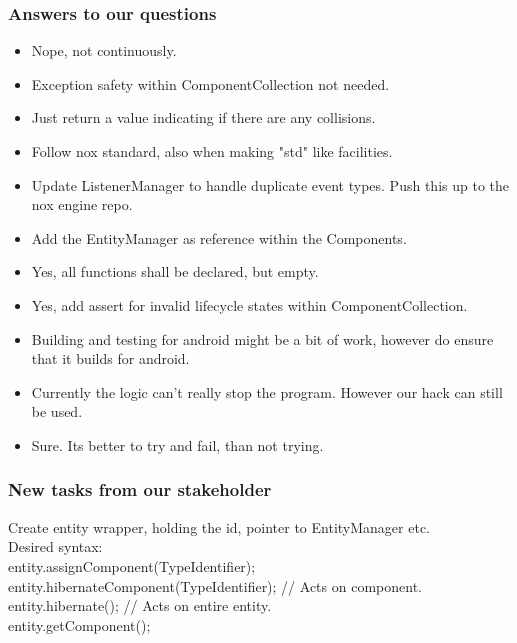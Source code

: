 \documentclass{article}
\begin{document}
\subsubsection*{Answers to our questions}
\begin{itemize}
    \item
    Nope, not continuously.

    \item
    Exception safety within ComponentCollection not needed.

    \item
    Just return a value indicating if there are any collisions.

    \item
    Follow nox standard, also when making "std" like facilities.

    \item
    Update ListenerManager to handle duplicate event types.
    Push this up to the nox engine repo.

    \item 
    Add the EntityManager as reference within the Components.

    \item
    Yes, all functions shall be declared, but empty.

    \item 
    Yes, add assert for invalid lifecycle states within ComponentCollection.

    \item
    Building and testing for android might be a bit of work, however do ensure that it builds for android.

    \item
    Currently the logic can't really stop the program.
    However our hack can still be used.

    \item 
    Sure. Its better to try and fail, than not trying.
\end{itemize}


\subsubsection*{New tasks from our stakeholder}
Create entity wrapper, holding the id, pointer to EntityManager etc.\\
Desired syntax:\\
entity.assignComponent(TypeIdentifier);\\
entity.hibernateComponent(TypeIdentifier); // Acts on component.\\
entity.hibernate(); // Acts on entire entity.\\
entity.getComponent();\\
\end{document}
